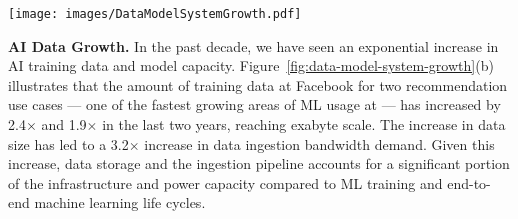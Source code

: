 \begin{figure*}[t]
    \centering
    \texttt{[image: images/DataModelSystemGrowth.pdf]}
    \caption{Deep learning has witnessed an exponential growth in data, model parameters, and system resources over the recent years.
    (a) The $1000\times$ model size growth has led to higher model accuracy for various ML tasks. For example, with GPT-3, to increase the model quality BLEU score from 5 to 40 requires a model $1,000\times$ larger in size. 
    (b) At \fb, the amount of data for recommendation use cases has roughly doubled between 2019 and 2021, leading to 3.2 times increase in the data ingestion bandwidth demand.
    (c) %
    \fb's recommendation and ranking model sizes have increased by 20 times during the same time period~\cite{Mudigere:scaling-training:2021}.
    (d) The explosive growth in AI has driven $2.9\times$ and $2.5\times$ capacity increases for AI training and inference, respectively.
    }
    \vspace{-0.25cm}
    \label{fig:data-model-system-growth}
\end{figure*}


\textbf{AI Data Growth.}
In the past decade, we have seen an exponential increase in AI training data and model capacity.
Figure~\ref{fig:data-model-system-growth}(b) illustrates that the amount of training data at Facebook for two recommendation use cases --- one of the fastest growing areas of ML usage at \fb --- has increased by 2.4$\times$ and 1.9$\times$ in the last two years, reaching exabyte scale.
The increase in data size has led to a 3.2$\times$ increase in data ingestion bandwidth demand.
Given this increase, data storage and the ingestion pipeline accounts for a significant portion of the infrastructure and power capacity compared to ML training and end-to-end machine learning life cycles.

